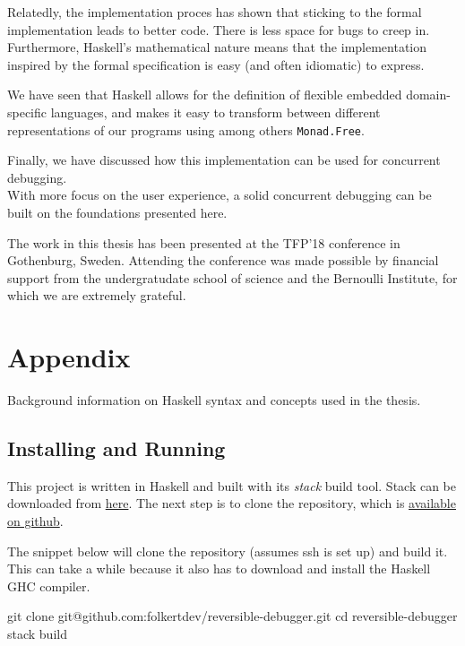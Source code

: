 \documentclass[runningheads,plain]{llncs}
\newenvironment{Shaded}{}{}
\newcommand{\FunctionTok}[1]{\textcolor[rgb]{0.02,0.16,0.49}{#1}}
\newcommand{\BuiltInTok}[1]{#1}
\newcommand{\ExtensionTok}[1]{#1}
\newcommand{\NormalTok}[1]{#1}
\begin{document}
Relatedly, the implementation proces has shown that sticking to the
formal implementation leads to better code. There is less space for bugs
to creep in. Furthermore, Haskell's mathematical nature means that the
implementation inspired by the formal specification is easy (and often
idiomatic) to express.

We have seen that Haskell allows for the definition of flexible embedded
domain-specific languages, and makes it easy to transform between
different representations of our programs using among others
\texttt{Monad.Free}.

Finally, we have discussed how this implementation can be used for
concurrent debugging.\\
With more focus on the user experience, a solid concurrent debugging can
be built on the foundations presented here.

The work in this thesis has been presented at the TFP'18 conference in
Gothenburg, Sweden. Attending the conference was made possible by
financial support from the undergratudate school of science and the
Bernoulli Institute, for which we are extremely grateful.


%


\pagebreak
\appendix

\section{Appendix}\label{appendix}

Background information on Haskell syntax and concepts used in the
thesis.

\subsection{Installing and Running}\label{installing-and-running}

This project is written in Haskell and built with its \emph{stack} build
tool. Stack can be downloaded from
\href{https://docs.haskellstack.org/en/stable/README/}{here}. The next
step is to clone the repository, which is
\href{https://github.com/folkertdev/reversible-debugger}{available on
github}.

The snippet below will clone the repository (assumes ssh is set up) and
build it. This can take a while because it also has to download and
install the Haskell GHC compiler.

\begin{Shaded}
\begin{Highlighting}[]
\FunctionTok{git}\NormalTok{ clone git@github.com:folkertdev/reversible-debugger.git}
\BuiltInTok{cd}\NormalTok{ reversible-debugger}
\ExtensionTok{stack}\NormalTok{ build}
\end{Highlighting}
\end{Shaded}
\end{document}
